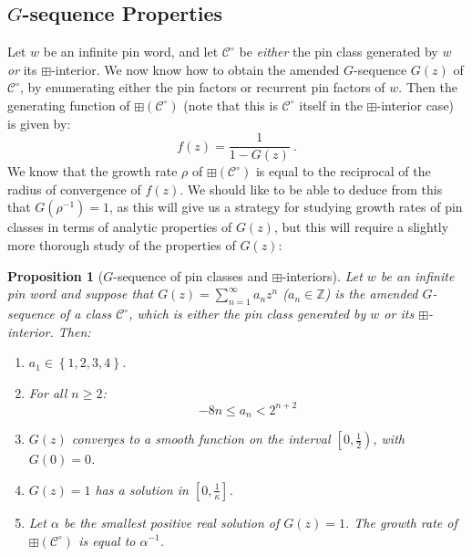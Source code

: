 \documentclass[11pt,a4paper]{article}
\newtheorem{prop}[thm]{Proposition}
\theoremstyle{definition}
\begin{document}
\subsection{$G$-sequence Properties} \label{sec:4.2}

Let $w$ be an infinite pin word, and let $\mathcal{C}^{\circ}$ be \emph{either} the pin class generated by $w$ \emph{or} its $\boxplus$-interior. We now know how to obtain the amended $G$-sequence $G(z)$ of $\mathcal{C}^{\circ}$, by enumerating either the pin factors or recurrent pin factors of $w$. Then the generating function of $\boxplus\left(\mathcal{C}^{\circ}\right)$ (note that this is $\mathcal{C}^{\circ}$ itself in the $\boxplus$-interior case) is given by:
\[
f(z) = \frac{1}{1 - G(z)} \ .
\]
We know that the growth rate $\rho$ of $\boxplus\left(\mathcal{C}^{\circ}\right)$ is equal to the reciprocal of the radius of convergence of $f(z)$. We should like to be able to deduce from this that $G(\rho^{-1}) = 1$, as this will give us a strategy for studying growth rates of pin classes in terms of analytic properties of $G(z)$, but this will require a slightly more thorough study of the properties of $G(z)$:

\begin{prop}[$G$-sequence of pin classes and $\boxplus$-interiors] \label{Gproperties}
Let $w$ be an infinite pin word and suppose that $G(z)= \sum_{n=1}^{\infty}a_{n}z^{n}$ ($a_{n} \in \mathbb{Z}$) is the amended $G$-sequence of a class $\mathcal{C}^{\circ}$, which is either the pin class generated by $w$ or its $\boxplus$-interior. Then:

\begin{enumerate}
\item $a_{1} \in \left\{1, 2, 3, 4\right\}$. \label{Gproperties1}
\item For all $n \geq 2$: \label{Gproperties2}
\[
-8n \leq a_{n} < 2^{n+2}
\]
\item $G(z)$ converges to a smooth function on the interval $\left[0,\frac{1}{2}\right)$, with $G(0) = 0$. \label{Gproperties3}
\item $G(z) = 1$ has a solution in $\left[0,\frac{1}{\kappa}\right]$. \label{Gproperties4}
\item Let $\alpha$ be the smallest positive real solution of $G(z)=1$. The growth rate of $\boxplus\left(\mathcal{C}^{\circ}\right)$ is equal to $\alpha^{-1}$. \label{Gproperties5}
\end{enumerate}

\end{prop}
\end{document}
